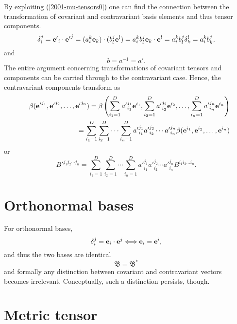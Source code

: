 By exploiting (\ref{2001-mu-tensors0}) one can find the connection between
the transformation of covariant and contravariant basis elements and thus
tensor components.
\begin{equation}
\delta_i^j= {{\bf e}'}_i\cdot {{\bf e}'}^j=(a_i^k{\bf e}_k)\cdot (b_l^j{\bf e}^l)=a_i^kb_l^j {\bf e}_k\cdot {\bf e}^l=a_i^kb_l^j \delta_k^l
=a_i^kb_k^j,
\end{equation}
and
\begin{equation}
b=a^{-1} =a'.
\end{equation}
The entire argument concerning transformations of covariant tensors and components
can be carried through to the contravariant case.
Hence, the contravariant components transform as
\begin{eqnarray}
&&\beta ( {{\bf e}'}^{j_1},{{\bf e}'}^{j_2},\ldots ,{{\bf e}'}^{j_n})=
\beta \left(
\sum_{i_1=1}^D {a'}^{j_1}_{i_1} {\bf e}^{i_1},
\sum_{i_2=1}^D {a'}^{j_2}_{i_2} {\bf e}^{i_2},
\ldots ,
\sum_{i_n=1}^D {a'}^{j_n}_{i_n} {\bf e}^{i_n}
\right)
\nonumber \\&& \quad
=
\sum_{i_1=1}^D\sum_{i_2=1}^D\cdots \sum_{i_n=1}^D
{a'}^{j_1}_{i_1}{a'}^{j_2}_{i_2}\cdots {a'}^{j_n}_{i_n} \beta ( {\bf e}^{i_1},{\bf e}^{i_2},\ldots ,{\bf e}^{i_n})
\end{eqnarray}
or
\begin{equation}
B'^{{j_1}{j_2}\cdots {j_n}}=
\sum_{i_1=1}^D\sum_{i_2=1}^D\cdots \sum_{i_n=1}^D
{a'}^{j_1}_{i_1}{a'}^{j_2}_{i_2}\cdots {a'}^{j_n}_{i_n} B^{i_1 i_2\ldots i_n}.
\end{equation}

\section{Orthonormal bases}
For orthonormal bases,
\begin{equation}
\delta_i^j = {\bf e}_i\cdot {\bf e}^j
\Longleftrightarrow
{\bf e}_i= {\bf e}^i  ,
\end{equation}
and thus the two bases are identical
\begin{equation}
{\mathfrak B}={\mathfrak B}^\ast
\end{equation}
and  formally any distinction between covariant and contravariant vectors becomes
irrelevant. Conceptually, such a distinction persists, though.


\section{Metric tensor}

